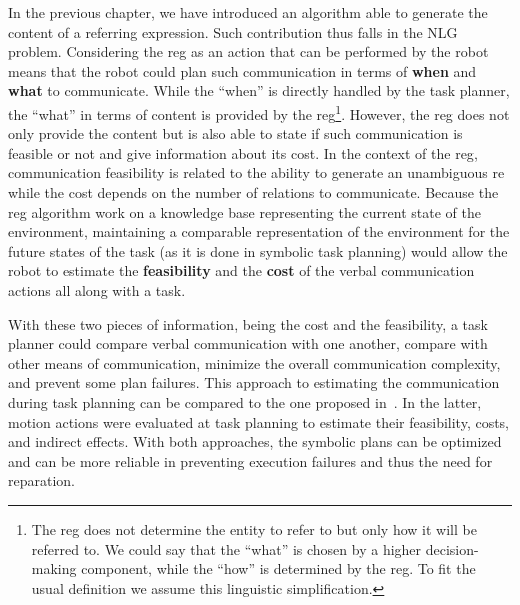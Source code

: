In the previous chapter, we have introduced an algorithm able to generate the content of a referring expression. Such contribution thus falls in the NLG problem. Considering the \acrshort{reg} as an action that can be performed by the robot means that the robot could plan such communication in terms of \textbf{when} and \textbf{what} to communicate. While the ``when'' is directly handled by the task planner, the ``what'' in terms of content is provided by the \acrshort{reg}\footnote{The \acrshort{reg} does not determine the entity to refer to but only how it will be referred to. We could say that the ``what'' is chosen by a higher decision-making component, while the ``how'' is determined by the \acrshort{reg}. To fit the usual definition we assume this linguistic simplification. }. However, the \acrshort{reg} does not only provide the content but is also able to state if such communication is feasible or not and give information about its cost. In the context of the \acrshort{reg}, communication feasibility is related to the ability to generate an unambiguous \acrshort{re} while the cost depends on the number of relations to communicate.  Because the \acrshort{reg} algorithm work on a knowledge base representing the current state of the environment, maintaining a comparable representation of the environment for the future states of the task (as it is done in symbolic task planning) would allow the robot to estimate the \textbf{feasibility} and the \textbf{cost} of the verbal communication actions all along with a task.

With these two pieces of information, being the cost and the feasibility, a task planner could compare verbal communication with one another, compare with other means of communication, minimize the overall communication complexity, and prevent some plan failures. This approach to estimating the communication during task planning can be compared to the one proposed in~\cite{lallement_2016_symbolic}. In the latter, motion actions were evaluated at task planning to estimate their feasibility, costs, and indirect effects. With both approaches, the symbolic plans can be optimized and can be more reliable in preventing execution failures and thus the need for reparation.

